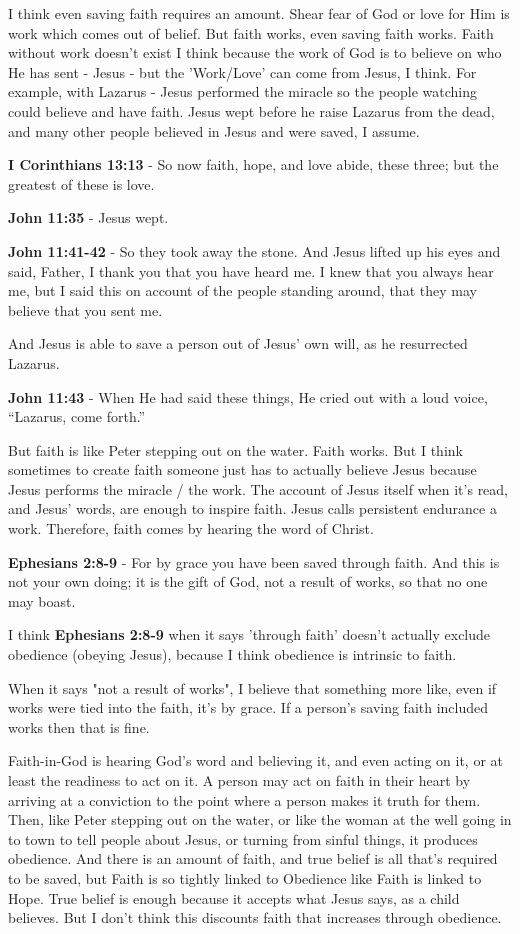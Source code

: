 \documentclass[11pt]{article}
\begin{document}
I think even saving faith requires an amount.
Shear fear of God or love for Him is work which comes out of belief.
But faith works, even saving faith works.
Faith without work doesn't exist I think because the work of God is to believe on who He has sent - Jesus - but the 'Work/Love' can come from Jesus, I think.
For example, with Lazarus - Jesus performed the miracle so the people watching could believe and have faith.
Jesus wept before he raise Lazarus from the dead, and many other people believed in Jesus and were saved, I assume.

\textbf{I Corinthians 13:13} - So now faith, hope, and love abide, these three; but the greatest of these is love.

\textbf{John 11:35} - Jesus wept.

\textbf{John 11:41-42} - So they took away the stone. And Jesus lifted up his eyes and said, Father, I thank you that you have heard me. I knew that you always hear me, but I said this on account of the people standing around, that they may believe that you sent me.

And Jesus is able to save a person out of Jesus' own will, as he resurrected Lazarus.

\textbf{John 11:43} - When He had said these things, He cried out with a loud voice, “Lazarus, come forth.”

But faith is like Peter stepping out on the water. Faith works. But I think sometimes to create faith someone just has to actually believe Jesus because Jesus performs the miracle / the work. The account of Jesus itself when it's read, and Jesus' words, are enough to inspire faith. Jesus calls persistent endurance a work. Therefore, faith comes by hearing the word of Christ.

\textbf{Ephesians 2:8-9} - For by grace you have been saved through faith. And this is not your own doing; it is the gift of God, not a result of works, so that no one may boast.

I think \textbf{Ephesians 2:8-9} when it says 'through faith' doesn't actually exclude obedience (obeying Jesus), because I think obedience is intrinsic to faith.

When it says "not a result of works", I believe that something more like, even if works were tied into the faith, it's by grace. If a person's saving faith included works then that is fine.

Faith-in-God is hearing God's word and believing it, and even acting on it, or at least the readiness to act on it.
A person may act on faith in their heart by arriving at a conviction to the point where a person makes it truth for them.
Then, like Peter stepping out on the water, or like the woman at the well going in to town to tell people about Jesus, or turning from sinful things, it produces obedience.
And there is an amount of faith, and true belief is all that's required to be saved, but Faith is so tightly linked to Obedience like Faith is linked to Hope. True belief is enough because it accepts what Jesus says, as a child believes. But I don't think this discounts faith that increases through obedience.
\end{document}
